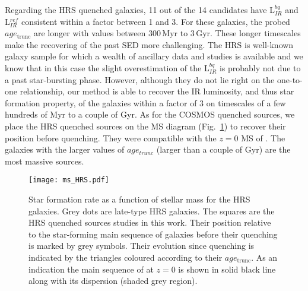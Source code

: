 \documentclass[traditabstract]{aa} %
\begin{document}
Regarding the HRS quenched galaxies, 11 out of the 14 candidates have L$_{IR}^{bq}$ and L$_{IR}^{ref}$ consistent within a factor between 1 and 3.
For these galaxies, the probed $age_{\mathrm{trunc}}$ are longer with values between 300\,Myr to 3\,Gyr.
These longer timescales make the recovering of the past SED more challenging.
The HRS is well-known galaxy sample for which a wealth of ancillary data and studies is available and we know that in this case the slight overestimation of the L$_{IR}^{bq}$ is probably not due to a past star-bursting phase.
However, although they do not lie right on the one-to-one relationship, our method is able to recover the IR luminosity, and thus star formation property, of the galaxies within a factor of 3 on timescales of a few hundreds of Myr to a couple of Gyr.
As for the COSMOS quenched sources, we place the HRS quenched sources on the MS diagram (Fig.~\ref{ms_HRS}) to recover their position before quenching.
They were compatible with the $z=0$ MS of \cite{Schreiber15}.
The galaxies with the larger values of $age_{trunc}$ (larger than a couple of Gyr) are the most massive sources. 

\begin{figure}[!h] 
  	\texttt{[image: ms\_HRS.pdf]}
  	\caption{\label{ms_HRS} Star formation rate as a function of stellar mass for the HRS galaxies. Grey dots are late-type HRS galaxies. The squares are the HRS quenched sources studies in this work. Their position relative to the star-forming main sequence of galaxies before their quenching is marked by grey symbols. Their evolution since quenching is indicated by the triangles coloured according to their $age_{\mathrm{trunc}}$. As an indication the main sequence of \cite{Schreiber15} at $z=0$ is shown in solid black line along with its dispersion (shaded grey region). }
\end{figure}
\end{document}
